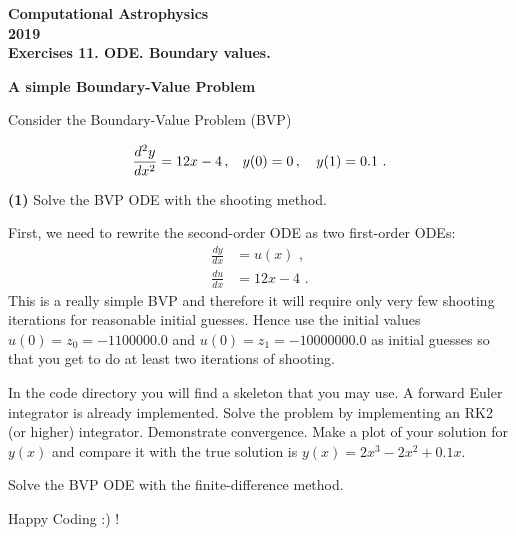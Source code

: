 \documentclass[11pt]{article}
\begin{document}
\begin{center}
\large \bf Computational Astrophysics \rm \\
2019\\
{\small Exercises 11. ODE. Boundary values.}
\end{center}

 {\bf A simple Boundary-Value Problem}

Consider the Boundary-Value Problem (BVP)

\begin{equation}
\frac{d^2 y}{dx^2} = 12x - 4\,,\hspace*{0.3cm}y(0) = 0\,,\,\hspace{0.3cm}y(1) = 0.1\,\,.
\end{equation}

{\bf (1)} Solve the BVP ODE with the shooting method.

First, we need to rewrite the second-order ODE as two first-order ODEs:
\begin{align}
\frac{dy}{dx} &= u(x)\,\,,\nonumber\\
\frac{du}{dx} &= 12x - 4\,\,.
\end{align}
This is a really simple BVP and therefore it will require only very few
shooting iterations for reasonable initial guesses. Hence use the initial values $u(0) = z_0 = -1100000.0$
and $u(0) = z_1 = -10000000.0$ as initial guesses so that you get to do at least two
iterations of shooting. 

In the code directory you will find  a skeleton that you may use.  A
forward Euler integrator is already implemented. Solve the problem
by implementing an RK2 (or higher) integrator. Demonstrate convergence. Make a
plot of your solution for $y(x)$ and compare it with the true solution
is $y(x) = 2x^3 - 2x^2 + 0.1x$.


 Solve the BVP
ODE with the finite-difference  method.
  

Happy Coding :) !
\end{document}
